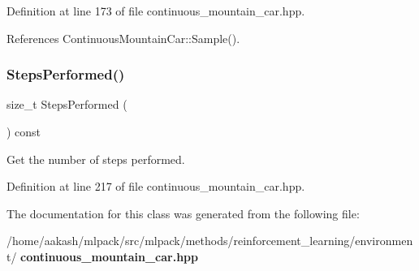 Definition at line 173 of file continuous\+\_\+mountain\+\_\+car.\+hpp.



References Continuous\+Mountain\+Car\+::\+Sample().

\mbox{\label{classmlpack_1_1rl_1_1ContinuousMountainCar_a5fe06563064ebcee88c593e1673f03d4}} 
\subsubsection{Steps\+Performed()}
{\footnotesize\ttfamily size\+\_\+t Steps\+Performed (\begin{DoxyParamCaption}{ }\end{DoxyParamCaption}) const\hspace{0.3cm}{\ttfamily [inline]}}



Get the number of steps performed. 



Definition at line 217 of file continuous\+\_\+mountain\+\_\+car.\+hpp.



The documentation for this class was generated from the following file\+:\begin{DoxyCompactItemize}
\item 
/home/aakash/mlpack/src/mlpack/methods/reinforcement\+\_\+learning/environment/\textbf{ continuous\+\_\+mountain\+\_\+car.\+hpp}\end{DoxyCompactItemize}
